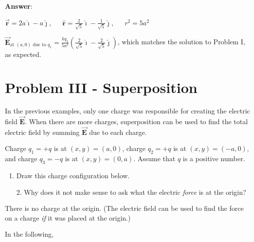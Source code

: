 \documentclass{article}
\newcommand{\ds}[0]{\displaystyle}
\newcommand{\ihat}[0]{\hat{\boldsymbol{\imath}}}
\newcommand{\jhat}[0]{\hat{\boldsymbol{\jmath}}}
\newcommand{\rhat}[0]{\hat{\mathbf{r}}}
\newcommand{\bfvec}[1]{\vec{\mathbf{#1}}}
\begin{document}


\ifsolutions
{\bf Answer}:

$\bfvec{r}=2a\ihat-a\jhat$,
$\quad$
$\ds\rhat=\frac{2}{\sqrt{5}}\ihat-\frac{1}{\sqrt{5}}\jhat$,
$\quad$ $r^2=5a^2$

$\ds\bfvec{E}_{\text{at }(a,0) \text{ due to }q_1}=\frac{kq_1}{5a^2}\left(\frac{2}{\sqrt{5}}\ihat -\frac{2}{\sqrt{5}}\jhat\right)$, which matches the solution to Problem I, as expected.
\fi

\newpage

\section{Problem III - Superposition}

In the previous examples, only one charge was responsible for creating the electric field $\bfvec{E}$. When there are more charges, superposition can be used to find the total electric field by summing $\bfvec{E}$ due to each charge.

Charge $q_1 = +q$ is at $(x, y) = (a, 0)$, charge $q_2 = +q$ is at $(x, y) = (-a, 0)$, and charge $q_3 = -q$ is at $(x, y) = (0, a)$. Assume that $q$ is a positive number.

\begin{enumerate}

  \item Draw this charge configuration below.

\end{enumerate}

\ifsolutions


\else


\fi
\ifsolutions\else

\fi

\begin{enumerate}

  \item[2.] Why does it not make sense to ask what the electric \emph{force} is at the origin?

\end{enumerate}

\ifsolutions
There is no charge at the origin. (The electric field can be used to find the force on a charge \emph{if} it was placed at the origin.)
\else

\vskip 24pt
\fi
\ifsolutions\else
\vskip 24pt
\fi

In the following, 
\end{document}
